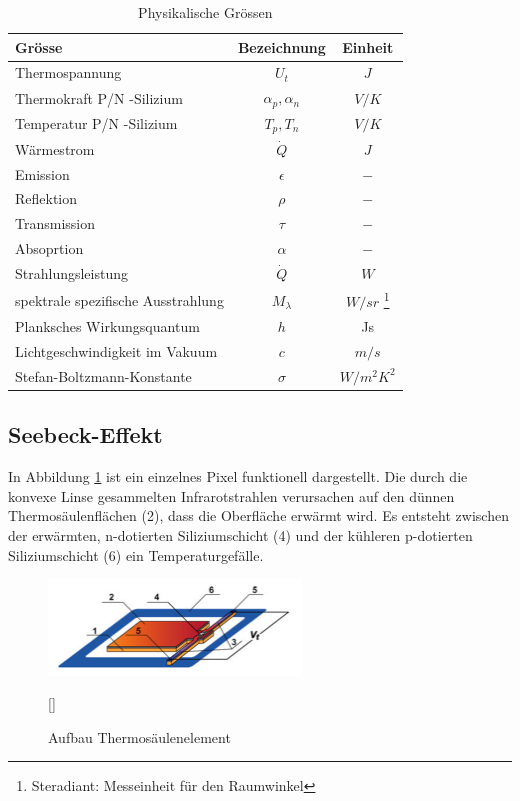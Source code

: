 \begin{table}[H]
	\centering
	\begin{tabular}{l|c|c}
		\rowcolor{gray} Grösse &  Bezeichnung  & Einheit \\
		\hline 
		Thermospannung &  $ U_{t}$ & $J$  \\ 
		\rowcolor{gray} Thermokraft P/N -Silizium  & $\alpha_{p},\alpha_{n}$ & $V/K$\\	
		Temperatur P/N -Silizium &  $T_{p},T_{n}$ & $V/K$ \\
		\rowcolor{gray}Wärmestrom &  $\dot{Q}$ & $J$  \\ 
		Emission & $\epsilon$ & $-$\\	
		\rowcolor{gray}Reflektion &  $\rho $ & $-$ \\
		Transmission & $\tau$ & $-$\\
		\rowcolor{gray}Absoprtion &  $\alpha$ & $-$  \\ 
		Strahlungsleistung & $\dot{Q}$ & $W$\\
		\rowcolor{gray}spektrale spezifische Ausstrahlung &  $M_{\lambda }$ & $W/sr$ \footnote[2]{Steradiant: Messeinheit für den Raumwinkel} \\
		Planksches Wirkungsquantum &  $ h$ & Js \\ 
		\rowcolor{gray} Lichtgeschwindigkeit im Vakuum & $c $ & $ m/s$ \\ 
 		Stefan-Boltzmann-Konstante & $\sigma$ & $ W/m^2K^2 $ \\ 
	\end{tabular}
	\caption{Physikalische Grössen}
	\label{tab:Legende Physikalische Grössen} 
\end{table} 


\subsection{Seebeck-Effekt}
\label{subsec:seebeck}
In Abbildung \ref{fig:AufbauThermo} ist ein einzelnes Pixel funktionell dargestellt. Die durch die konvexe Linse gesammelten Infrarotstrahlen verursachen auf den dünnen Thermosäulenflächen (2), dass die Oberfläche erwärmt wird. Es entsteht zwischen der erwärmten, n-dotierten Siliziumschicht (4) und der kühleren p-dotierten Siliziumschicht (6) ein Temperaturgefälle.   

\begin{figure}[H]
	\centering
	\includegraphics[width=0.6\textwidth]
	{fig/Mems_Thermopile.PNG}
	\caption[Aufbau Thermosäulenelement]{Aufbau Thermosäulenelement} [\protect\cite{AMG8834}]
	\label{fig:AufbauThermo}
\end{figure}

